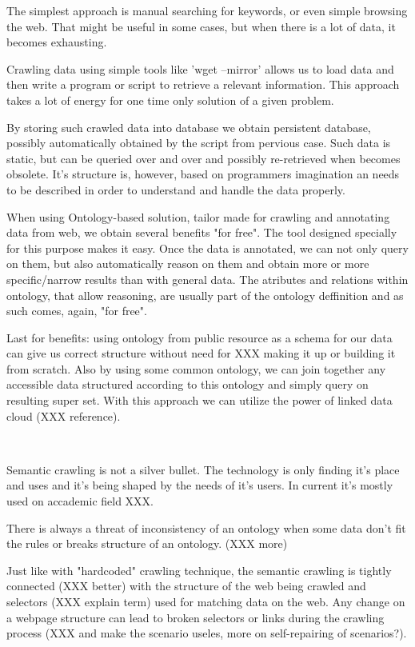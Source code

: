 The simplest approach is manual searching for keywords, or even simple browsing
the web. That might be useful in some cases, but when there is a lot of data,
it becomes exhausting. 

Crawling data using simple tools like 'wget --mirror' allows us to load data
and then write a program or script to retrieve a relevant information. This
approach takes a lot of energy for one time only solution of a given problem. 

By storing such crawled data into database we obtain persistent database,
possibly automatically obtained by the script from pervious case. Such data is
static, but can be queried over and over and possibly re-retrieved when becomes
obsolete. It's structure is, however, based on programmers imagination an
needs to be described in order to understand and handle the data properly. 

When using Ontology-based solution, tailor made for crawling and annotating
data from web, we obtain several benefits "for free". The tool designed
specially for this purpose makes it easy. Once the data is annotated, we can
not only query on them, but also automatically reason on them and obtain more
or more specific/narrow results than with general data. The atributes and
relations within ontology, that allow reasoning, are usually part of the
ontology deffinition and as such comes, again, "for free". 

Last for benefits: using ontology from public resource as a schema for our data
can give us correct structure without need for XXX making it up or building it
from scratch. Also by using some common ontology, we can join together any
accessible data structured according to this ontology and simply query on
resulting super set. With this approach we can utilize the power of linked data
cloud (XXX reference). 

~

Semantic crawling is not a silver bullet. The technology is only finding it's
place and uses and it's being shaped by the needs of it's users. In current
it's mostly used on accademic field XXX. 

There is always a threat of inconsistency of an ontology when some data don't
fit the rules or breaks structure of an ontology. (XXX more)

Just like with "hardcoded" crawling technique, the semantic crawling is tightly
connected (XXX better) with the structure of the web being crawled and
selectors (XXX explain term) used for matching data on the web. Any change on a
webpage structure can lead to broken selectors or links during the crawling
process (XXX and make the scenario useles, more on self-repairing of
scenarios?). 

